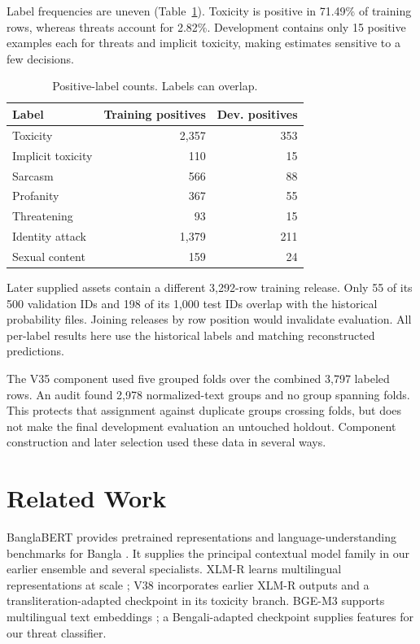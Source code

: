 \documentclass[10pt,a4paper]{article}
\begin{document}
Label frequencies are uneven (Table~\ref{tab:labels}). Toxicity is positive in 71.49\% of training rows, whereas threats account for 2.82\%. Development contains only 15 positive examples each for threats and implicit toxicity, making estimates sensitive to a few decisions.

\begin{table}[t]\centering\small
\begin{tabular}{lrr}\toprule
Label & Training positives & Dev. positives\\\midrule
Toxicity & 2,357 & 353\\
Implicit toxicity & 110 & 15\\
Sarcasm & 566 & 88\\
Profanity & 367 & 55\\
Threatening & 93 & 15\\
Identity attack & 1,379 & 211\\
Sexual content & 159 & 24\\\bottomrule
\end{tabular}
\caption{Positive-label counts. Labels can overlap.}\label{tab:labels}
\end{table}

Later supplied assets contain a different 3,292-row training release. Only 55 of its 500 validation IDs and 198 of its 1,000 test IDs overlap with the historical probability files. Joining releases by row position would invalidate evaluation. All per-label results here use the historical labels and matching reconstructed predictions.

The V35 component used five grouped folds over the combined 3,797 labeled rows. An audit found 2,978 normalized-text groups and no group spanning folds. This protects that assignment against duplicate groups crossing folds, but does not make the final development evaluation an untouched holdout. Component construction and later selection used these data in several ways.

\section{Related Work}
BanglaBERT provides pretrained representations and language-understanding benchmarks for Bangla \citep{banglabert}. It supplies the principal contextual model family in our earlier ensemble and several specialists. XLM-R learns multilingual representations at scale \citep{xlmr}; V38 incorporates earlier XLM-R outputs and a transliteration-adapted checkpoint in its toxicity branch. BGE-M3 supports multilingual text embeddings \citep{bgem3}; a Bengali-adapted checkpoint supplies features for our threat classifier.
\end{document}
